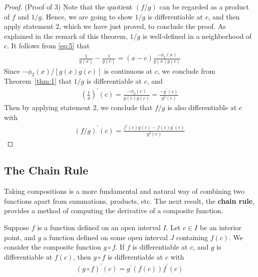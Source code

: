 \documentclass[thmcnt=section, 12pt]{my-elegantbook}
\begin{document}
\begin{proof}
    (Proof of 3) Note that the quotient $(f / g)$ can be regarded as a product of $f$ and $1 / g$. Hence, we are going to show $1/g$ is differentiable at $c$, and then apply statement 2, which we have just proved, to conclude the proof. As explained in the remark of this theorem, $1/g$ is well-defined in a neighborhood of $c$. It follows from \eqref{eq:5} that 
    \begin{align*}
        \frac{1}{g(x)} - \frac{1}{g(c)}
        = (x - c) \frac{-\phi_2(x)}{g(x)g(c)}
    \end{align*}
    Since $-\phi_2(x) / [g(x)g(c)]$ is continuous at $c$, we conclude from Theorem~\ref{thm:1} that $1/g$ is differentiable at $c$, and 
    \begin{align*}
        \left( \frac{1}{g} \right)^\prime (c)
        = \frac{-\phi_2(c)}{g(c)g(c)}
        = \frac{-g^\prime(c)}{g^2(c)}
    \end{align*}
    Then by applying statement 2, we conclude that $f / g$ is also differentiable at $c$ with 
    \begin{align*}
        (f / g)^\prime(c) = \frac{f^\prime(c) g(c) - f(c) g^\prime(c)}{ g^2(c) }
    \end{align*}
\end{proof}


\subsection{The Chain Rule}

Taking compositions is a more fundamental and natural way of combining two functions apart from summations, products, etc. The next result, the \textbf{chain rule}, provides a method of computing the derivative of a composite function.

\begin{theorem} \label{thm:4}
    Suppose $f$ is a function defined on an open interval $I$.
	Let $c \in I$ be an interior point,
	and $g$ a function defined on some open interval $J$ containing $f(c)$. 
	We consider the composite function $g \circ f$. 
	If $f$ is differentiable at $c$, 
	and $g$ is differentiable at $f(c)$, 
	then $g \circ f$ is differentiable at $c$ with 
    \begin{align}
        (g \circ f)^\prime (c)
        = g^\prime(f(c)) f^\prime(c)
        \label{eq:9}
    \end{align}
\end{theorem}
\end{document}
